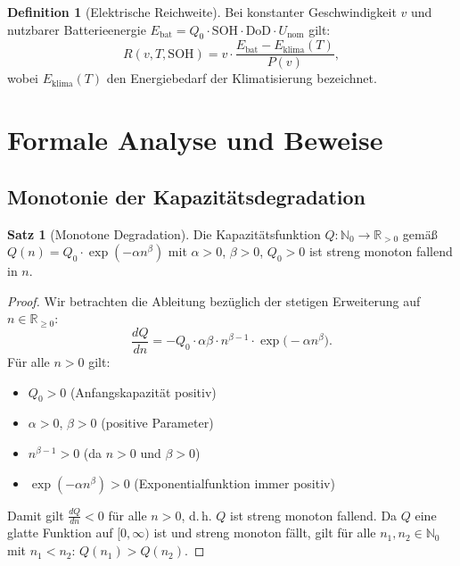 ﻿\documentclass[a4paper,12pt]{article}
\theoremstyle{definition}
\newtheorem{definition}{Definition}
\newtheorem{satz}{Satz}
\begin{document}
\begin{definition}[Elektrische Reichweite]
  Bei konstanter Geschwindigkeit $v$ und nutzbarer Batterieenergie
  $E_{\mathrm{bat}} = Q_0 \cdot \mathrm{SOH} \cdot \mathrm{DoD} \cdot U_{\mathrm{nom}}$
  gilt:
  \[
    R(v, T, \mathrm{SOH}) = v \cdot \frac{E_{\mathrm{bat}} - E_{\mathrm{klima}}(T)}{P(v)},
  \]
  wobei $E_{\mathrm{klima}}(T)$ den Energiebedarf der Klimatisierung bezeichnet.
\end{definition}

\section{Formale Analyse und Beweise}

\subsection{Monotonie der Kapazit\"atsdegradation}

\begin{satz}[Monotone Degradation]
\label{satz:monoton}
  Die Kapazit\"atsfunktion $Q: \mathbb{N}_0 \to \mathbb{R}_{>0}$ gem\"a\ss{}
  $Q(n) = Q_0 \cdot \exp(-\alpha n^{\beta})$ mit $\alpha > 0$, $\beta > 0$,
  $Q_0 > 0$ ist streng monoton fallend in $n$.
\end{satz}

\begin{proof}
  Wir betrachten die Ableitung bez\"uglich der stetigen Erweiterung auf
  $n \in \mathbb{R}_{\geq 0}$:
  \[
    \frac{dQ}{dn} = -Q_0 \cdot \alpha\beta \cdot n^{\beta-1} \cdot
      \exp\!\bigl(-\alpha n^{\beta}\bigr).
  \]
  F\"ur alle $n > 0$ gilt:
  \begin{itemize}
    \item $Q_0 > 0$ (Anfangskapazit\"at positiv)
    \item $\alpha > 0$, $\beta > 0$ (positive Parameter)
    \item $n^{\beta-1} > 0$ (da $n > 0$ und $\beta > 0$)
    \item $\exp(-\alpha n^{\beta}) > 0$ (Exponentialfunktion immer positiv)
  \end{itemize}
  Damit gilt $\frac{dQ}{dn} < 0$ f\"ur alle $n > 0$, d.\,h. $Q$ ist streng
  monoton fallend. Da $Q$ eine glatte Funktion auf $[0,\infty)$ ist
  und streng monoton f\"allt, gilt f\"ur alle $n_1, n_2 \in \mathbb{N}_0$
  mit $n_1 < n_2$: $Q(n_1) > Q(n_2)$.
\end{proof}
\end{document}
